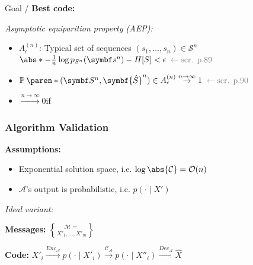 Goal / \textbf{Best code:}\enspace
{}

\emph{Asymptotic equiparition property (AEP):}
\vspace{-2pt}
\begin{itemize}
    \item $A_\epsilon^{(n)}$:
        Typical set of sequences $(s_1,\ldots,s_n) \in \mathcal S^n$\\\qquad
        $\abs*{-\frac1n \log p_{S^n} (\symbf s^n) - H[S]} < \epsilon$\hfill
        $\color{gray} \leftarrow \text{scr. p.89}$
    \item $\P*{(\symbf S^n, \symbf{\hat S}^n) \in A_\epsilon^{(n)}} \overset{n\to\infty}{\to} 1$\hfill
        $\color{gray} \leftarrow \text{scr. p.90}$
    \item {}
        $\overset{n\to\infty}{\to} 0$\enspace if\enspace {}
\end{itemize}


\subsubsection{Algorithm Validation}

\textbf{Assumptions:}
\begin{itemize}
    \item Exponential solution space, i.e. $\log\abs{\mathcal C} = \mathcal O(n)$
    \item $\mathcal A$'s output is probabilistic, i.e. $p(\cdot \mid X')$
\end{itemize}

\emph{Ideal variant:}

\textbf{Messages:}\enspace
$\mathcal M = \brace{ X'_1, \ldots, X'_m }$
\vspace{-2pt}

\textbf{Code:}\enspace
$X'_i \xrightarrow{Enc_{\mathcal A}} p(\cdot\mid X'_i)
\xrightarrow{\mathcal{C_A}} p(\cdot\mid X''_i)
\xrightarrow{Dec_{\mathcal A}} \hat X$

